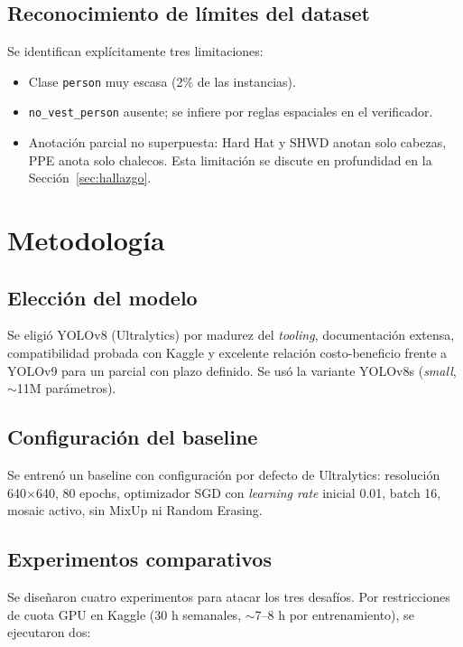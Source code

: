 \documentclass[conference]{IEEEtran}
\begin{document}
\subsection{Reconocimiento de límites del dataset}

Se identifican explícitamente tres limitaciones:
\begin{itemize}
    \item Clase \texttt{person} muy escasa (2\% de las instancias).
    \item \texttt{no\_vest\_person} ausente; se infiere por reglas
    espaciales en el verificador.
    \item Anotación parcial no superpuesta: Hard Hat y SHWD anotan
    solo cabezas, PPE anota solo chalecos. Esta limitación se discute
    en profundidad en la Sección~\ref{sec:hallazgo}.
\end{itemize}

\section{Metodología}

\subsection{Elección del modelo}

Se eligió YOLOv8 \cite{ultralytics2023} (Ultralytics) por madurez del
\emph{tooling}, documentación extensa, compatibilidad probada con Kaggle
y excelente relación costo-beneficio frente a YOLOv9 para un parcial
con plazo definido. Se usó la variante YOLOv8s (\emph{small},
$\sim$11M parámetros).

\subsection{Configuración del baseline}

Se entrenó un baseline con configuración por defecto de Ultralytics:
resolución 640$\times$640, 80 epochs, optimizador SGD con
\emph{learning rate} inicial 0.01, batch 16, mosaic activo, sin MixUp
ni Random Erasing.

\subsection{Experimentos comparativos}

Se diseñaron cuatro experimentos para atacar los tres desafíos. Por
restricciones de cuota GPU en Kaggle (30 h semanales, $\sim$7--8 h por
entrenamiento), se ejecutaron dos:
\end{document}
